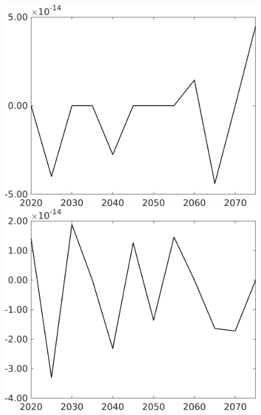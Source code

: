 \begin{figure}[h!!]
\begin{minipage}[]{0.32\textwidth}
\end{minipage}	
\begin{minipage}[]{0.32\textwidth}
\includegraphics[width=1\textwidth]{../../codding_model/own_basedOnFried/optimalPol_010922_revision/figures/all_13Sept22/CompTaul_Equlab_LFBAUPer_Reg0_pf_spillover0_nsk1_xgr1_knspil0_sep1_countec0_GovRev0_etaa0.79.png}
\end{minipage}
\begin{minipage}[]{0.32\textwidth}
\includegraphics[width=1\textwidth]{../../codding_model/own_basedOnFried/optimalPol_010922_revision/figures/all_13Sept22/CompTaul_Equlab_LFBAUPer_Reg0_pg_spillover0_nsk1_xgr1_knspil0_sep1_countec0_GovRev0_etaa0.79.png}
\end{minipage}
\end{figure}

